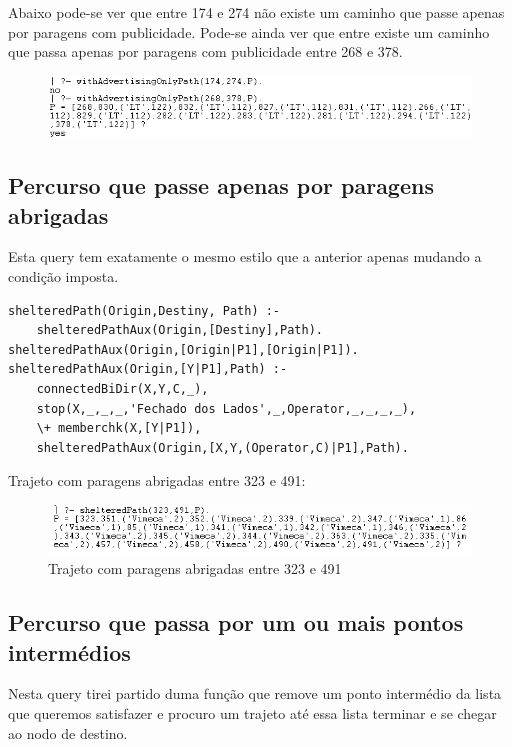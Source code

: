\documentclass[20pt]{article}
\begin{document}
Abaixo pode-se ver que entre 174 e 274 não existe um caminho que passe apenas por paragens com publicidade. Pode-se ainda ver que entre existe um caminho que passa apenas por paragens com publicidade entre 268 e 378.

 \vspace{1cm}
\begin{figure}[h]
    \centering
    \includegraphics[scale=0.8]{images/advertising.png}
\end{figure}

\newpage
\subsection{Percurso que passe apenas por paragens abrigadas}
Esta query tem exatamente o mesmo estilo que a anterior apenas mudando a condição imposta.
\begin{verbatim}
shelteredPath(Origin,Destiny, Path) :-  
    shelteredPathAux(Origin,[Destiny],Path).
shelteredPathAux(Origin,[Origin|P1],[Origin|P1]).
shelteredPathAux(Origin,[Y|P1],Path) :-
    connectedBiDir(X,Y,C,_),
    stop(X,_,_,_,'Fechado dos Lados',_,Operator,_,_,_,_),
    \+ memberchk(X,[Y|P1]), 
    shelteredPathAux(Origin,[X,Y,(Operator,C)|P1],Path).    
\end{verbatim}

Trajeto com paragens abrigadas entre 323 e 491:
 \vspace{1cm}
\begin{figure}[h]
    \centering
    \includegraphics[scale=0.8]{images/sheltered_path.png}
    \caption{Trajeto com paragens abrigadas entre 323 e 491}
\end{figure}

\newpage
\subsection{Percurso que passa por um ou mais pontos intermédios}
Nesta query tirei partido duma função que remove um ponto intermédio da lista que queremos satisfazer e procuro um trajeto até essa lista terminar e se chegar ao nodo de destino.
\end{document}
